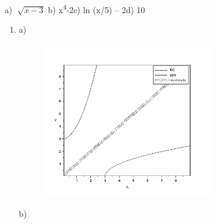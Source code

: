 \documentclass[12pt]{article}
\begin{document}
\begin{multicols}{2}

\vspace{\baselineskip}

\vspace{\baselineskip}

\end{multicols}
	\item a)  \( \sqrt[]{x-3} \) \tab b) x\textsuperscript{4}-2\tab \tab c) ln (x/5) – 2\tab d) 10\par


\vspace{\baselineskip}
\begin{enumerate}
	\item a) \par




\begin{figure}[H]
	\begin{Center}
		\includegraphics[width=2.95in,height=2.68in]{./media/image17.png}
	\end{Center}
\end{figure}



\par

b)\par





\end{enumerate}
\end{document}
